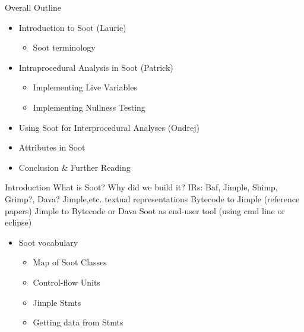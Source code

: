 \begin{slide}{Overall Outline}
\begin{itemize}
\item Introduction to Soot (Laurie)
\begin{itemize}
\item Soot terminology
\end{itemize}
\item Intraprocedural Analysis in Soot (Patrick)
\begin{itemize}
\item Implementing Live Variables
\item Implementing Nullness Testing
\end{itemize}
\item Using Soot for Interprocedural Analyses (Ondrej)
\item Attributes in Soot
\item Conclusion \& Further Reading
\end{itemize}
\end{slide}

\begin{slide}{Introduction}
What is Soot?
Why did we build it?
IRs: Baf, Jimple, Shimp, Grimp?, Dava?
Jimple,etc. textual representations
Bytecode to Jimple (reference papers)
Jimple to Bytecode or Dava
Soot as end-user tool (using cmd line or eclipse)

\begin{itemize}
\item Soot vocabulary
\begin{itemize}
\item Map of Soot Classes
\item Control-flow Units
\item Jimple Stmts
\item Getting data from Stmts
\end{itemize}
\end{itemize}
\end{slide}

